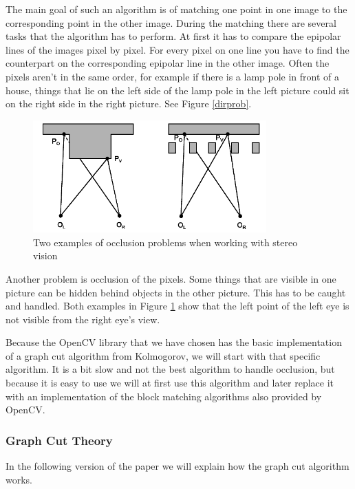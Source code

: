 \documentclass[a4paper]{article}
\begin{document}
The main goal of such an algorithm is of
matching one point in one image to the corresponding point in the
other image. During the matching there are several tasks that the
algorithm has to perform. At first it has to compare the epipolar
lines of the images pixel by pixel. For every pixel on one line you
have to find the counterpart on the corresponding epipolar line in the
other image. Often the pixels aren't in the same order, for example if
there is a lamp pole in front of a house, things that lie on the left
side of the lamp pole in the left picture could sit on the right side
in the right picture. See Figure \ref{dirprob}.

\begin{figure} [h!tb]
\centering
\includegraphics[width=0.8\textwidth]{matching_problems_occlusion}
\caption{Two examples of occlusion problems when working with stereo
vision}
\label{occprob} 
\end{figure}

Another problem is occlusion of the pixels. Some things that are
visible in one picture can be hidden behind objects in the other
picture. This has to be caught and handled. Both examples in Figure \ref{occprob}
show that the left point of the left eye is not visible from the right
eye's view.

Because the OpenCV library that we have chosen has the basic
implementation of a graph cut algorithm from
Kolmogorov\cite{kolmogorov2003}, we will start with that specific
algorithm. It is a bit slow and not the best algorithm to handle
occlusion, but because it is easy to use we will at first use this
algorithm and later replace it with an implementation of the block
matching algorithms also provided by OpenCV. 

\subsubsection{Graph Cut Theory}
\label{gc_theory}
In the following version of the paper we will explain how the graph
cut algorithm works.
\end{document}
